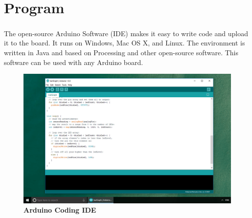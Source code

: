 \chapter{Program}
\paragraph{}The open-source Arduino Software (IDE) makes it easy to write code and upload it to the board. It runs on Windows, Mac OS X, and Linux. The environment is written in Java and based on Processing and other open-source software. This software can be used with any Arduino board.

\begin{figure}[H]
 \centering
    \includegraphics[height= 7cm, width=13cm]{project/images/ide}
  \caption{\textbf{Arduino Coding IDE}}
\end{figure}

